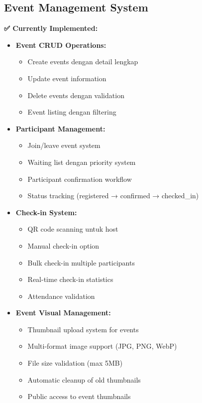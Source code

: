 \documentclass[12pt,a4paper]{article}
\begin{document}
\subsection{Event Management System}

\begin{implemented}
\textbf{✅ Currently Implemented:}
\begin{itemize}
    \item \textbf{Event CRUD Operations:}
    \begin{itemize}
        \item Create events dengan detail lengkap
        \item Update event information
        \item Delete events dengan validation
        \item Event listing dengan filtering
    \end{itemize}
    \item \textbf{Participant Management:}
    \begin{itemize}
        \item Join/leave event system
        \item Waiting list dengan priority system
        \item Participant confirmation workflow
        \item Status tracking (registered → confirmed → checked\_in)
    \end{itemize}
    \item \textbf{Check-in System:}
    \begin{itemize}
        \item QR code scanning untuk host
        \item Manual check-in option
        \item Bulk check-in multiple participants
        \item Real-time check-in statistics
        \item Attendance validation
    \end{itemize}
    \item \textbf{Event Visual Management:}
    \begin{itemize}
        \item Thumbnail upload system for events
        \item Multi-format image support (JPG, PNG, WebP)
        \item File size validation (max 5MB)
        \item Automatic cleanup of old thumbnails
        \item Public access to event thumbnails
    \end{itemize}
\end{itemize}
\end{implemented}
\end{document}
